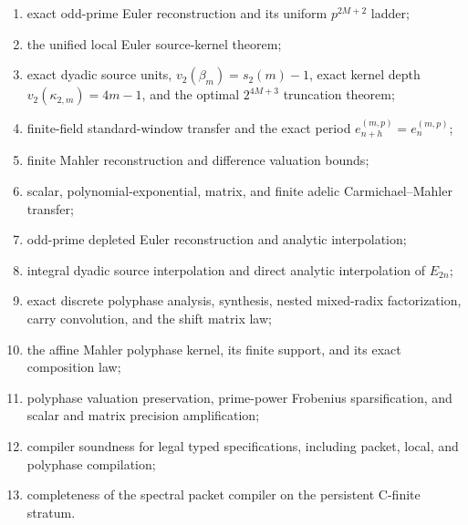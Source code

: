 \documentclass[11pt]{article}
\theoremstyle{definition}\newtheorem{definition}[theorem]{Definition}\newtheorem{example}[theorem]{Example}\newtheorem{construction}[theorem]{Construction}\newtheorem{algorithm}[theorem]{Algorithm}\newtheorem{conjecture}[theorem]{Conjecture}\newtheorem{problem}[theorem]{Problem}
\theoremstyle{remark}\newtheorem{remark}[theorem]{Remark}\newtheorem{boundary}[theorem]{Boundary}\newtheorem{certificate}[theorem]{Computational Certificate}\newtheorem{classical}[theorem]{Classical Input}\newtheorem{principle}[theorem]{Structural Principle}
\begin{document}
\begin{enumerate}
\item exact odd-prime Euler reconstruction and its uniform $p^{2M+2}$ ladder;
\item the unified local Euler source-kernel theorem;
\item exact dyadic source units, $v_2(\beta_m)=s_2(m)-1$, exact kernel depth $v_2(\kappa_{2,m})=4m-1$, and the optimal $2^{4M+3}$ truncation theorem;
\item finite-field standard-window transfer and the exact period $e_{n+h}^{(m,p)}=e_n^{(m,p)}$;
\item finite Mahler reconstruction and difference valuation bounds;
\item scalar, polynomial-exponential, matrix, and finite adelic Carmichael--Mahler transfer;
\item odd-prime depleted Euler reconstruction and analytic interpolation;
\item integral dyadic source interpolation and direct analytic interpolation of $E_{2n}$;
\item exact discrete polyphase analysis, synthesis, nested mixed-radix factorization, carry convolution, and the shift matrix law;
\item the affine Mahler polyphase kernel, its finite support, and its exact composition law;
\item polyphase valuation preservation, prime-power Frobenius sparsification, and scalar and matrix precision amplification;
\item compiler soundness for legal typed specifications, including packet, local, and polyphase compilation;
\item completeness of the spectral packet compiler on the persistent C-finite stratum.
\end{enumerate}
\end{document}
